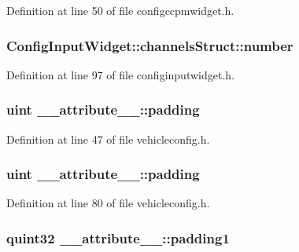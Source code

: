 Definition at line 50 of file configccpmwidget.\-h.

\hypertarget{group___config_plugin_gaba81d9d5d38874bfa4f1c91ec8ff6ec3}{
\subsubsection[{number}]{ Config\-Input\-Widget\-::channels\-Struct\-::number}}\label{group___config_plugin_gaba81d9d5d38874bfa4f1c91ec8ff6ec3}


Definition at line 97 of file configinputwidget.\-h.

\hypertarget{group___config_plugin_gae439ab85c005f3400498997049fd50e8}{
\subsubsection[{padding}]{\setlength{\rightskip}{0pt plus 5cm}uint \-\_\-\-\_\-attribute\-\_\-\-\_\-\-::padding}}\label{group___config_plugin_gae439ab85c005f3400498997049fd50e8}


Definition at line 47 of file vehicleconfig.\-h.

\hypertarget{group___config_plugin_gae439ab85c005f3400498997049fd50e8}{
\subsubsection[{padding}]{\setlength{\rightskip}{0pt plus 5cm}uint \-\_\-\-\_\-attribute\-\_\-\-\_\-\-::padding}}\label{group___config_plugin_gae439ab85c005f3400498997049fd50e8}


Definition at line 80 of file vehicleconfig.\-h.

\hypertarget{group___config_plugin_ga1d4a76a1f0c36316d50d1ae3f788ef4e}{
\subsubsection[{padding1}]{\setlength{\rightskip}{0pt plus 5cm}quint32 \-\_\-\-\_\-attribute\-\_\-\-\_\-\-::padding1}}\label{group___config_plugin_ga1d4a76a1f0c36316d50d1ae3f788ef4e}


